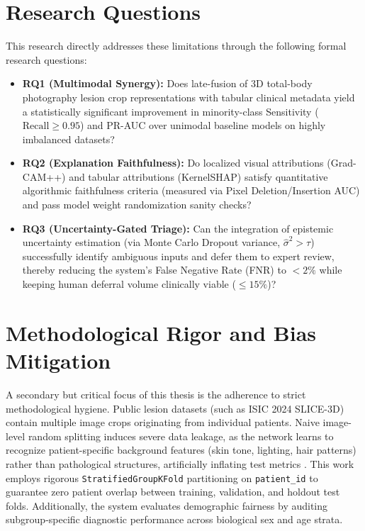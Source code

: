 \documentclass[12pt,a4paper]{report}
\begin{document}
	\section{Research Questions}
	This research directly addresses these limitations through the following formal research questions:
	\begin{itemize}
		\item \textbf{RQ1 (Multimodal Synergy):} Does late-fusion of 3D total-body photography lesion crop representations with tabular clinical metadata yield a statistically significant improvement in minority-class Sensitivity ($\text{Recall} \ge 0.95$) and PR-AUC over unimodal baseline models on highly imbalanced datasets?
		\item \textbf{RQ2 (Explanation Faithfulness):} Do localized visual attributions (Grad-CAM++) and tabular attributions (KernelSHAP) satisfy quantitative algorithmic faithfulness criteria (measured via Pixel Deletion/Insertion AUC) and pass model weight randomization sanity checks?
		\item \textbf{RQ3 (Uncertainty-Gated Triage):} Can the integration of epistemic uncertainty estimation (via Monte Carlo Dropout variance, $\hat{\sigma}^2 > \tau$) successfully identify ambiguous inputs and defer them to expert review, thereby reducing the system's False Negative Rate (FNR) to $< 2\%$ while keeping human deferral volume clinically viable ($\le 15\%$)?
	\end{itemize}
	
	\section{Methodological Rigor and Bias Mitigation}
	A secondary but critical focus of this thesis is the adherence to strict methodological hygiene. Public lesion datasets (such as ISIC 2024 SLICE-3D) contain multiple image crops originating from individual patients. Naive image-level random splitting induces severe data leakage, as the network learns to recognize patient-specific background features (skin tone, lighting, hair patterns) rather than pathological structures, artificially inflating test metrics \cite{bisla2019towards}. This work employs rigorous \texttt{StratifiedGroupKFold} partitioning on \texttt{patient\_id} to guarantee zero patient overlap between training, validation, and holdout test folds. Additionally, the system evaluates demographic fairness by auditing subgroup-specific diagnostic performance across biological sex and age strata.
	
\end{document}
